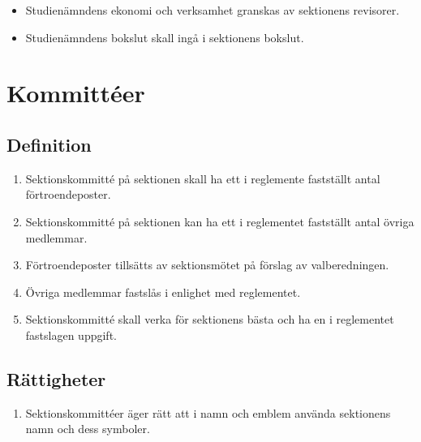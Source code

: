 \documentclass[11pt,a4paper]{article}
\begin{document}
\begin{itemize}

  \item Studienämndens ekonomi och verksamhet granskas av sektionens
  revisorer.

  \item Studienämndens bokslut skall ingå i sektionens bokslut.

\end{itemize}

\newpage



\section{Kommittéer}

\subsection{Definition}

\begin{enumerate}[\thesubsection .1]

  \item Sektionskommitté på sektionen skall ha ett i reglemente
  fastställt antal förtroendeposter.

  \item Sektionskommitté på sektionen kan ha ett i reglementet
  fastställt antal övriga medlemmar.

  \item Förtroendeposter tillsätts av sektionsmötet på förslag av
  valberedningen.

  \item Övriga medlemmar fastslås i enlighet med reglementet.

  \item Sektionskommitté skall verka för sektionens bästa och ha en i
  reglementet fastslagen uppgift.

\end{enumerate}


\subsection{Rättigheter}

\begin{enumerate}[\thesubsection .1]

  \item Sektionskommittéer äger rätt att i namn och emblem använda
  sektionens namn och dess symboler.

\end{enumerate}
\end{document}
